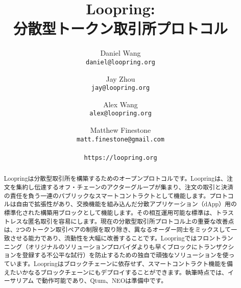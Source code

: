 \documentclass{article}
\title{\textbf{Loopring:}\\\textbf{分散型トークン取引所プロトコル}}
\author{
  Daniel Wang\\
  \texttt{daniel@loopring.org}\\
  \and
  	Jay Zhou\\
  	\texttt{jay@loopring.org}\\
  	\and
  	Alex Wang\\
  	\texttt{alex@loopring.org}\\
  	\and
  	Matthew Finestone\\
  	\texttt{matt.finestone@gmail.com}\\ 
  \\
  \texttt{https://loopring.org}
 }
\begin{document}
\maketitle


\begin{abstract}
Loopringは分散型取引所を構築するためのオープンプロトコルです。Loopringは、注文を集約し伝達するオフ・チェーンのアクターグループが集まり、注文の取引と決済の責任を負う一連のパブリックなスマートコントラクトとして機能します。プロトコルは自由で拡張性があり、交換機能を組み込んだ分散アプリケーション（dApp）用の標準化された構築用ブロックとして機能します。その相互運用可能な標準は、トラストレスな匿名取引を容易にします。現在の分散型取引所プロトコル上の重要な改善点は、2つのトークン取引ペアの制限を取り除き、異なるオーダー同士をミックスして一致させる能力であり、流動性を大幅に改善することです。Loopringではフロントランニング（オリジナルのソリューションプロバイダよりも早くブロックにトランザクションを登録する不公平な試行）を防止するための独自で頑強なソリューションを使っています。Loopringはブロックチェーンに依存せず、スマートコントラクト機能を備えたいかなるブロックチェーンにもデプロイすることができます。執筆時点では、イーサリアム\cite{buterin2017ethereum} \cite{wood2014ethereum}で動作可能であり、Qtum\cite{dai2017smart}、NEO\cite{atterlonn2018distributed}は準備中です。
\end{abstract}
\end{document}
